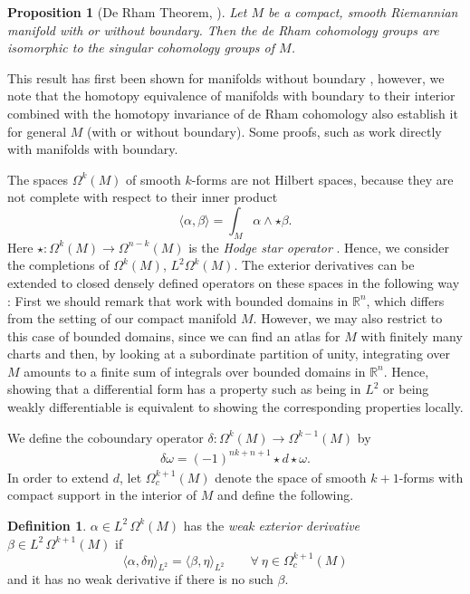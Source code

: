 \documentclass[11pt]{article}
\newtheorem{prop}[theorem]{Proposition}
\theoremstyle{definition}
\newtheorem{definition}[theorem]{Definition}
\theoremstyle{remark}
\newcommand{\R}{\mathbb{R}}
\begin{document}
\begin{prop}[\textnormal{De Rham Theorem, \cite{dRSamelson}}]
    Let $M$ be a compact, smooth Riemannian manifold with or without boundary. Then the de Rham cohomology groups are isomorphic to the singular cohomology groups of $M$.
\end{prop}
This result has first been shown for manifolds without boundary \citep{deRham}, however, we note that the homotopy equivalence of manifolds with boundary to their interior \citep[Theorem 9.26]{lee} combined with the homotopy invariance of de Rham cohomology \citep[Theorem 17.11]{lee} also establish it for general $M$ (with or without boundary). Some proofs, such as \citep{dRSamelson} work directly with manifolds with boundary. 

The spaces $\Omega^k(M)$ of smooth $k$-forms are not Hilbert spaces, because they are not complete with respect to their inner product
$$
    \langle \alpha ,\beta \rangle = \int_M \alpha \wedge \star \beta.
$$
Here $\star:\Omega^k(M) \rightarrow \Omega^{n-k}(M)$ is the \emph{Hodge star operator} \citep[see][\S16]{lee}.  Hence, we consider the completions of $\Omega^k(M)$, $L^2\Omega^k(M)$. The exterior derivatives can be extended to closed densely defined operators on these spaces in the following way \citep[see][\S4.2]{finderham}: First we should remark that \citet{finderham} work with bounded domains in $\R^n$, which differs from the setting of our compact manifold $M$. However, we may also restrict to this case of bounded domains, since we can find an atlas for $M$ with finitely many charts and then, by looking at a subordinate partition of unity, integrating over $M$ amounts to a finite sum of integrals over bounded domains in $\R^n$. Hence, showing that a differential form has a property such as being in $L^2$ or being weakly differentiable is equivalent to showing the corresponding properties locally.

We define the coboundary operator $\delta: \Omega^k(M) \rightarrow \Omega^{k-1}(M)$ by \citep[see][problems 16-22]{lee}
\begin{align}
    \delta \omega =(-1)^{nk+n+1} \star d \star \omega. \label{defeq:delta}
\end{align}
In order to extend $d$, let $\Omega_c^{k+1}(M)$ denote the space of smooth $k+1$-forms with compact support in the interior of $M$ and define the following. 
\begin{definition}\textnormal{\citep[Weak Exterior Derivative,][\S4.2]{finderham}}
     $\alpha \in L^2\, \Omega^k(M)$ has the \emph{weak exterior derivative} $\beta \in L^2 \, \Omega^{k+1}(M)$ if
$$
    \langle \alpha , \delta \eta \rangle_{L^2}=\langle \beta , \eta \rangle_{L^2} \qquad \forall\ \eta \in \Omega_c^{k+1}(M)
$$
and it has no weak derivative if there is no such $\beta$.
\end{definition}
\end{document}
